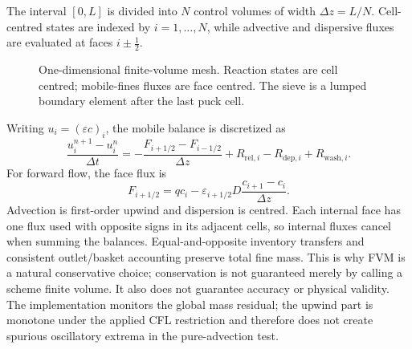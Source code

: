 \documentclass[11pt,a4paper]{article}
\begin{document}
The interval $[0,L]$ is divided into $N$ control volumes of width
$\Delta z=L/N$. Cell-centred states are indexed by $i=1,\ldots,N$, while
advective and dispersive fluxes are evaluated at faces $i\pm\tfrac12$.

\begin{figure}[H]
\centering
{}
\caption{One-dimensional finite-volume mesh. Reaction states are cell centred;
mobile-fines fluxes are face centred. The sieve is a lumped boundary element
after the last puck cell.}
\label{fig:fvm}
\end{figure}

Writing $u_i=(\varepsilon c)_i$, the mobile balance is discretized as
\begin{equation}
\frac{u_i^{n+1}-u_i^n}{\Delta t}
=-\frac{F_{i+1/2}-F_{i-1/2}}{\Delta z}
+R_{\mathrm{rel},i}-R_{\mathrm{dep},i}+R_{\mathrm{wash},i}.
\end{equation}
For forward flow, the face flux is
\begin{equation}
F_{i+1/2}=q c_i
-\varepsilon_{i+1/2}D\frac{c_{i+1}-c_i}{\Delta z}.
\end{equation}
Advection is first-order upwind and dispersion is centred. Each internal face
has one flux used with opposite signs in its adjacent cells, so internal fluxes
cancel when summing the balances. Equal-and-opposite inventory transfers and
consistent outlet/basket accounting preserve total fine mass. This is why FVM
is a natural conservative choice; conservation is not guaranteed merely by
calling a scheme finite volume. It also does not guarantee accuracy or physical
validity. The implementation monitors the global mass residual;
 the upwind part is monotone under the applied CFL restriction and
therefore does not create spurious oscillatory extrema in the pure-advection test.
\end{document}
